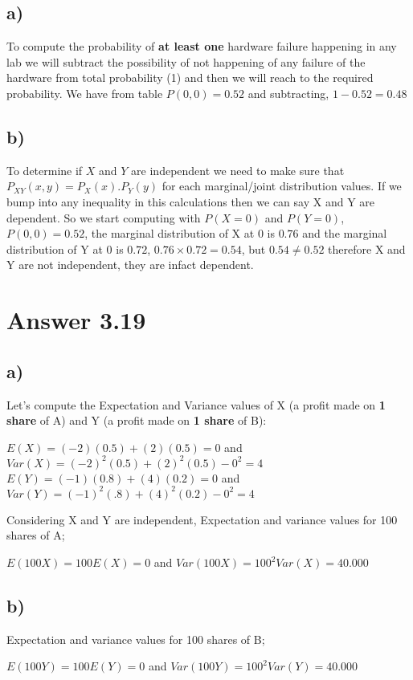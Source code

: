 \documentclass[12pt]{article}
\begin{document}
\subsection*{a)}
To compute the probability of \textbf{at least one} hardware failure happening in any lab we will subtract the possibility of not happening of any failure of the hardware from total probability (1) and then we will reach to the required probability. We have from table $P(0,0) = 0.52$ and subtracting, $1 - 0.52 = 0.48$
\subsection*{b)}
To determine if $X$ and $Y$ are independent we need to make sure that $P_{XY}(x,y)=P_X(x).P_Y(y)$ for each marginal/joint distribution values. If we bump into any inequality in this calculations then we can say X and Y are dependent. So we start computing with $P(X=0)$ and $P(Y=0)$, $P(0,0)=0.52$, the marginal distribution of X at 0 is $0.76$ and the marginal distribution of Y at 0 is $0.72$, $0.76 \times 0.72=0.54$, but $0.54 \neq 0.52$ therefore X and Y are not independent, they are infact dependent.

\section*{Answer 3.19}
\subsection*{a)}
Let's compute the Expectation and Variance values of X (a profit made on \textbf{1 share} of A) and Y (a profit made on \textbf{1 share} of B):

\begin{center}
$E(X) =(-2)(0.5) + (2)(0.5) = 0 $ and 
$Var(X) = (-2)^2 (0.5) + (2)^2 (0.5)-0^2 = 4$
$E(Y) = (-1)(0.8) + (4)(0.2) = 0$ and
$Var(Y)=(-1)^2(.8)+(4)^2(0.2)-0^2 = 4$
\end{center} 
Considering X and Y are independent, Expectation and variance values for 100 shares of A;
\begin{center}
$E(100X) = 100E(X) = 0$ and $Var(100X) = 100^2 Var(X) = 40.000 $
\end{center}
\subsection*{b)}
Expectation and variance values for 100 shares of B;
\begin{center}
$E(100Y) = 100E(Y) = 0$ and $Var (100Y) = 100^2 Var(Y) = 40.000$
\end{center}
\end{document}
